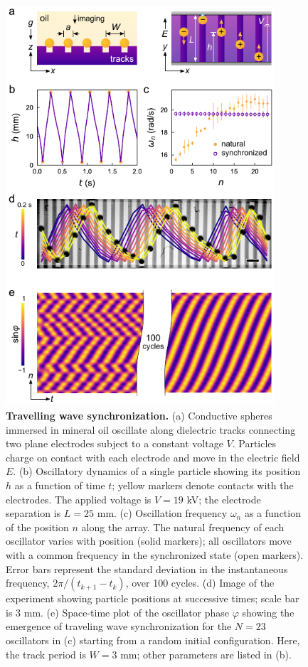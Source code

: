\begin{figure}[p!]
    \centering
    \includegraphics[width=10cm]{figures/3_1.pdf}
    \caption{\textbf{Travelling wave synchronization.} (a) Conductive spheres immersed in mineral oil oscillate along dielectric tracks connecting two plane electrodes subject to a constant voltage $V$. Particles charge on contact with each electrode and move in the electric field $E$. (b) Oscillatory dynamics of a single particle showing its position $h$  as a function of time $t$; yellow markers denote contacts with the electrodes. The applied voltage is $V=19$ kV; the electrode separation is $L=25$ mm. (c) Oscillation frequency $\omega_n$ as a function of the position $n$ along the array. The natural frequency of each oscillator varies with position (solid markers); all oscillators move with a common frequency in the synchronized state (open markers). Error bars represent the standard deviation in the instantaneous frequency, $2\pi/(t_{k+1}-t_k)$, over 100 cycles. (d) Image of the experiment showing particle positions at successive times; scale bar is 3 mm. (e) Space-time plot of the oscillator phase $\varphi$ showing the emergence of traveling wave synchronization for the $N=23$ oscillators in (c) starting from a random initial configuration.  Here, the track period is $W=3$ mm; other parameters are listed in (b).}
    \label{fig:1}
\end{figure}


